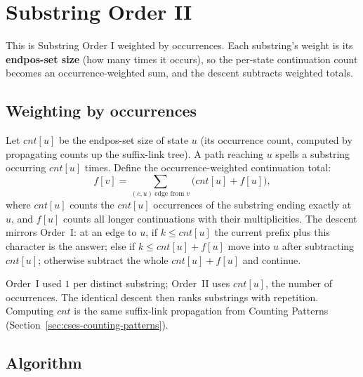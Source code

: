 \section{Substring Order II}
\label{sec:cses-substring-order-ii}


\begin{patternbox}
This is Substring Order I weighted by occurrences. Each substring's weight
is its \textbf{endpos-set size} (how many times it occurs), so the
per-state continuation count becomes an occurrence-weighted sum, and the
descent subtracts weighted totals.
\end{patternbox}

\subsection*{Weighting by occurrences}

Let $\textit{cnt}[u]$ be the endpos-set size of state $u$ (its occurrence
count, computed by propagating counts up the suffix-link tree). A path
reaching $u$ spells a substring occurring $\textit{cnt}[u]$ times. Define
the occurrence-weighted continuation total:
\[
  f[v]=\sum_{(c,u)\ \text{edge from }v}\big(\textit{cnt}[u]+f[u]\big),
\]
where $\textit{cnt}[u]$ counts the $\textit{cnt}[u]$ occurrences of the
substring ending exactly at $u$, and $f[u]$ counts all longer
continuations with their multiplicities. The descent mirrors Order~I: at an
edge to $u$, if $k\le\textit{cnt}[u]$ the current prefix plus this
character is the answer; else if $k\le\textit{cnt}[u]+f[u]$ move into $u$
after subtracting $\textit{cnt}[u]$; otherwise subtract the whole
$\textit{cnt}[u]+f[u]$ and continue.

\begin{ideabox}
Order~I used $1$ per distinct substring; Order~II uses $\textit{cnt}[u]$,
the number of occurrences. The identical descent then ranks substrings with
repetition. Computing $\textit{cnt}$ is the same suffix-link propagation
from Counting Patterns (Section~\ref{sec:cses-counting-patterns}).
\end{ideabox}

\subsection*{Algorithm}

